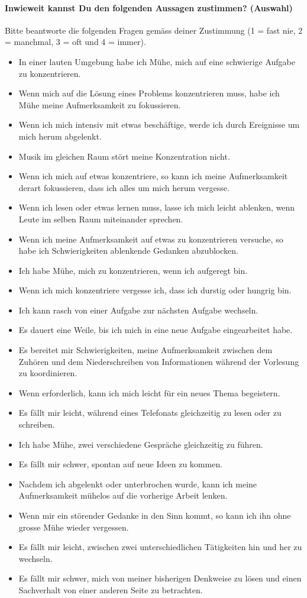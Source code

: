 \paragraph{Inwieweit kannst Du den folgenden Aussagen zustimmen? (Auswahl)}
Bitte beantworte die folgenden Fragen gemäss deiner Zustimmung (1 = fast nie, 2 = manchmal, 3 = oft und 4 = immer).
    \begin{itemize}
      \item In einer lauten Umgebung habe ich Mühe, mich auf eine schwierige Aufgabe zu konzentrieren.
      \item Wenn mich auf die Lösung eines Problems konzentrieren muss, habe ich Mühe meine Aufmerksamkeit zu fokussieren.
      \item Wenn ich mich intensiv mit etwas beschäftige, werde ich durch Ereignisse um mich herum abgelenkt.
      \item Musik im gleichen Raum stört meine Konzentration nicht.
      \item Wenn ich mich auf etwas konzentriere, so kann ich meine Aufmerksamkeit derart fokussieren, dass ich alles um mich herum vergesse.
      \item Wenn ich lesen oder etwas lernen muss, lasse ich mich leicht ablenken, wenn Leute im selben Raum miteinander sprechen.
      \item Wenn ich meine Aufmerksamkeit auf etwas zu konzentrieren versuche, so habe ich Schwierigkeiten ablenkende Gedanken abzublocken.
      \item Ich habe Mühe, mich zu konzentrieren, wenn ich aufgeregt bin.
      \item Wenn ich mich konzentriere vergesse ich, dass ich durstig oder hungrig bin.
      \item Ich kann rasch von einer Aufgabe zur nächsten Aufgabe wechseln.
      \item Es dauert eine Weile, bis ich mich in eine neue Aufgabe eingearbeitet habe.
      \item Es bereitet mir Schwierigkeiten, meine Aufmerksamkeit zwischen dem Zuhören und dem Niederschreiben von Informationen während der Vorlesung zu koordinieren.
      \item Wenn erforderlich, kann ich mich leicht für ein neues Thema begeistern.
      \item Es fällt mir leicht, während eines Telefonats gleichzeitig zu lesen oder zu schreiben.
      \item Ich habe Mühe, zwei verschiedene Gespräche gleichzeitig zu führen.
      \item Es fällt mir schwer, spontan auf neue Ideen zu kommen.
      \item Nachdem ich abgelenkt oder unterbrochen wurde, kann ich meine Aufmerksamkeit mühelos auf die vorherige Arbeit lenken.
      \item Wenn mir ein störender Gedanke in den Sinn kommt, so kann ich ihn ohne grosse Mühe wieder vergessen.
      \item Es fällt mir leicht, zwischen zwei unterschiedlichen Tätigkeiten hin und her zu wechseln.
      \item Es fällt mir schwer, mich von meiner bisherigen Denkweise zu lösen und einen Sachverhalt von einer anderen Seite zu betrachten.
    \end{itemize}
